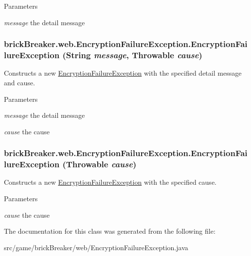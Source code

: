 \begin{DoxyParams}{Parameters}
\item[{\em message}]the detail message \end{DoxyParams}
\hypertarget{classbrick_breaker_1_1web_1_1_encryption_failure_exception_ac5820d6e36448bfa6286d3fd4466bcaa}{
\subsubsection[{EncryptionFailureException}]{\setlength{\rightskip}{0pt plus 5cm}brickBreaker.web.EncryptionFailureException.EncryptionFailureException (String {\em message}, \/  Throwable {\em cause})}}
\label{classbrick_breaker_1_1web_1_1_encryption_failure_exception_ac5820d6e36448bfa6286d3fd4466bcaa}
Constructs a new {\ttfamily \hyperlink{classbrick_breaker_1_1web_1_1_encryption_failure_exception}{EncryptionFailureException}} with the specified detail message and cause.


\begin{DoxyParams}{Parameters}
\item[{\em message}]the detail message \item[{\em cause}]the cause \end{DoxyParams}
\hypertarget{classbrick_breaker_1_1web_1_1_encryption_failure_exception_a0786930d051f36cb85a6d3d704b6cdfb}{
\subsubsection[{EncryptionFailureException}]{\setlength{\rightskip}{0pt plus 5cm}brickBreaker.web.EncryptionFailureException.EncryptionFailureException (Throwable {\em cause})}}
\label{classbrick_breaker_1_1web_1_1_encryption_failure_exception_a0786930d051f36cb85a6d3d704b6cdfb}
Constructs a new {\ttfamily \hyperlink{classbrick_breaker_1_1web_1_1_encryption_failure_exception}{EncryptionFailureException}} with the specified cause.


\begin{DoxyParams}{Parameters}
\item[{\em cause}]the cause \end{DoxyParams}


The documentation for this class was generated from the following file:\begin{DoxyCompactItemize}
\item 
src/game/brickBreaker/web/EncryptionFailureException.java\end{DoxyCompactItemize}

